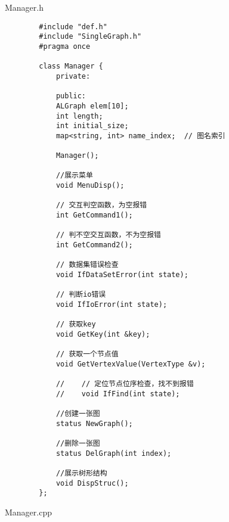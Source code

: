 \documentclass[supercite]{Experimental_Report}
\begin{document}
	Manager.h
	\begin{lstlisting}
		#include "def.h"
		#include "SingleGraph.h"
		#pragma once
		
		class Manager {
			private:
			
			public:
			ALGraph elem[10];
			int length;
			int initial_size;
			map<string, int> name_index;  // 图名索引
			
			Manager();
			
			//展示菜单
			void MenuDisp();
			
			// 交互判空函数，为空报错
			int GetCommand1();
			
			// 判不空交互函数，不为空报错
			int GetCommand2();
			
			// 数据集错误检查
			void IfDataSetError(int state);
			
			// 判断io错误
			void IfIoError(int state);
			
			// 获取key
			void GetKey(int &key);
			
			// 获取一个节点值
			void GetVertexValue(VertexType &v);
			
			//    // 定位节点位序检查，找不到报错
			//    void IfFind(int state);
			
			//创建一张图
			status NewGraph();
			
			//删除一张图
			status DelGraph(int index);
			
			//展示树形结构
			void DispStruc();
		};
	\end{lstlisting}
	Manager.cpp
\end{document}
